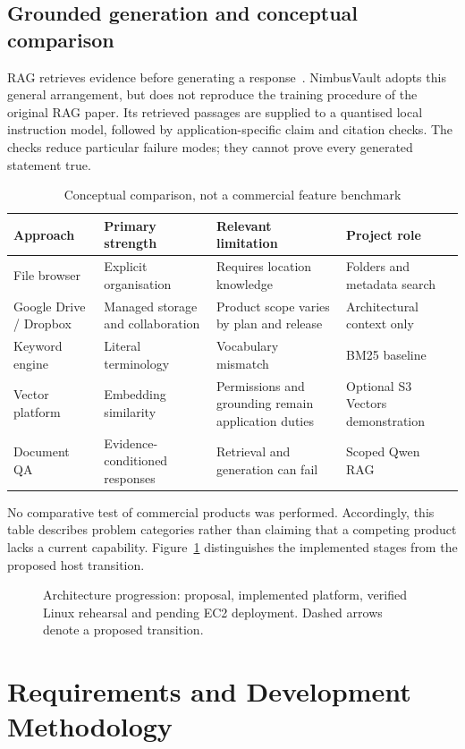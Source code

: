 \documentclass[11pt,a4paper,oneside]{report}
\newcommand{\ShortCaption}[1]{\csname ShortCaption#1\endcsname}
\newcommand{\diagram}[3]{\par\begin{figure}[htbp]\centering\sbox{\DiagramBox}{}\ifdim\wd\DiagramBox>\linewidth\resizebox{\linewidth}{!}{\usebox{\DiagramBox}}\else\usebox{\DiagramBox}\fi\caption[\ShortCaption{#1}]{#2}\label{fig:#3}\end{figure}\par}
\begin{document}
\section{Grounded generation and conceptual comparison}
RAG retrieves evidence before generating a response~\cite{ragpaper}. NimbusVault adopts this general arrangement, but does not reproduce the training procedure of the original RAG paper. Its retrieved passages are supplied to a quantised local instruction model, followed by application-specific claim and citation checks. The checks reduce particular failure modes; they cannot prove every generated statement true.
\par\begin{table}[htbp]\caption{Conceptual comparison, not a commercial feature benchmark}\small\begin{tabularx}{\linewidth}{p{.25\linewidth}YYY}\toprule Approach&Primary strength&Relevant limitation&Project role\\\midrule
File browser&Explicit organisation&Requires location knowledge&Folders and metadata search\\
Google Drive / Dropbox&Managed storage and collaboration&Product scope varies by plan and release&Architectural context only\\
Keyword engine&Literal terminology&Vocabulary mismatch&BM25 baseline\\
Vector platform&Embedding similarity&Permissions and grounding remain application duties&Optional S3 Vectors demonstration\\
Document QA&Evidence-conditioned responses&Retrieval and generation can fail&Scoped Qwen RAG\\\bottomrule\end{tabularx}\end{table}\par
No comparative test of commercial products was performed. Accordingly, this table describes problem categories rather than claiming that a competing product lacks a current capability.
Figure~\ref{fig:evolution} distinguishes the implemented stages from the proposed host transition.
\diagram{evolution}{Architecture progression: proposal, implemented platform, verified Linux rehearsal and pending EC2 deployment. Dashed arrows denote a proposed transition.}{evolution}
\FloatBarrier

\chapter{Requirements and Development Methodology}
\end{document}
